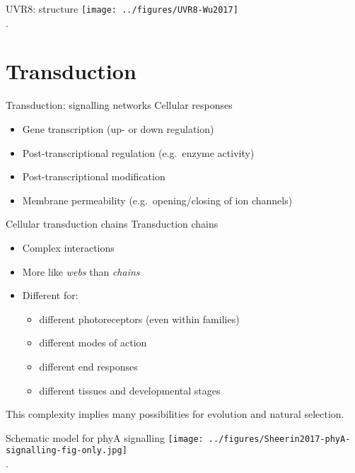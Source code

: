 \documentclass[10pt]{beamer}
\begin{document}
\begin{frame}{UVR8: structure}
    \centering
    \texttt{[image: ../figures/UVR8-Wu2017]}\\
    {\footnotesize \autocite[from][]{Wu2017}.}
\end{frame}

\section{Transduction}

\begin{frame}{Transduction: signalling networks}
    Cellular responses
    \begin{itemize}
        \item Gene transcription (up- or down regulation)
        \item Post-transcriptional regulation (e.g.\ enzyme activity)
        \item Post-transcriptional modification
        \item Membrane permeability (e.g.\ opening/closing of ion channels)
    \end{itemize}
\end{frame}

\begin{frame}{Cellular transduction chains}
    Transduction chains
    \begin{itemize}
        \item Complex interactions
        \item More like \textsl{webs} than \textsl{chains}
        \item<3-> Different for:
        \begin{itemize}
            \item different photoreceptors (even within families)
            \item different modes of action
            \item different end responses
            \item different tissues and developmental stages
        \end{itemize}
    \end{itemize}

    This complexity implies many possibilities for evolution and natural
    selection.
\end{frame}

\begin{frame}{Schematic model for phyA signalling}
    \centering
    \texttt{[image: ../figures/Sheerin2017-phyA-signalling-fig-only.jpg]}\\
    {\footnotesize \autocite[Fig.\ 2 in][]{Sheerin2017}.}
\end{frame}
\end{document}
